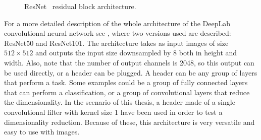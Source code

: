 \begin{figure}[h]
  \centering
  \caption{ResNet~\resnet{} residual block architecture. }
  \label{fig:backbonearchitecture:resnetblock}
\end{figure}

For a more detailed description of the whole architecture of the DeepLab convolutional neural network see , where two versions used are described: ResNet50 and ResNet101.
The architecture takes as input images of size $512 \times 512$ and outputs the input size downsampled by $8$ both in height and width.
Also, note that the number of output channels is 2048, so this output can be used directly, or a header can be plugged.
A header can be any group of layers that perform a task. Some examples could be a group of fully connected layers that can perform a classification,
or a group of convolutional layers that reduce the dimensionality.
In the scenario of this thesis, a header made of a single convolutional filter with kernel size 1 have been used in order to test a dimensionality reduction.
Because of these, this architecture is very versatile and easy to use with images.

